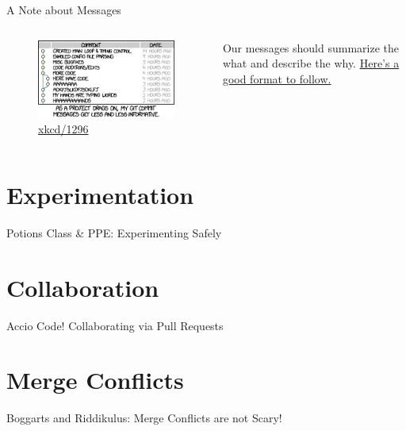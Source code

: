 \documentclass{beamer}
\theoremstyle{example}
\newcommand{\xkcd}[1]{\href{https://xkcd.com/#1}{xkcd/#1}}
\begin{document}
\begin{frame}{A Note about Messages}
    \begin{columns}
        \begin{figure}
            \includegraphics[scale=0.4]{img/git_commit}
            \caption{\xkcd{1296}}
        \end{figure}

        Our messages should summarize the what and describe the why.
        \href{https://tbaggery.com/2008/04/19/a-note-about-git-commit-messages.html}
        {Here's a good format to follow.}
    \end{columns}
\end{frame}

\section{Experimentation}
\begin{frame}{Potions Class \& PPE\@: Experimenting Safely}
\end{frame}

\section{Collaboration}
\begin{frame}{Accio Code! Collaborating via Pull Requests}
\end{frame}

\section{Merge Conflicts}
\begin{frame}{Boggarts and Riddikulus: Merge Conflicts are \alert{not} Scary!}
\end{frame}
\end{document}
